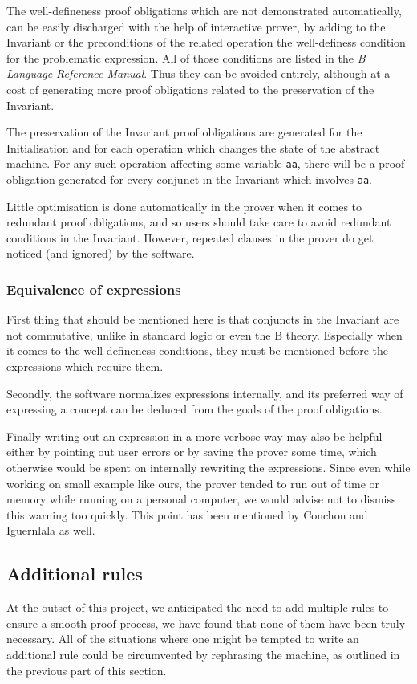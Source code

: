 \documentclass[12pt,journal,duplex]{IEEEtran}
\begin{document}
	The well-defineness proof obligations which are not demonstrated automatically, can be easily discharged with the help of interactive prover, by adding to the Invariant or the preconditions of the related operation the well-definess condition for the problematic expression. All of those conditions are listed in the \emph{B Language Reference Manual}. Thus they can be avoided entirely, although at a cost of generating more proof obligations related to the preservation of the Invariant.

	The preservation of the Invariant proof obligations are generated for the Initialisation and for each operation which changes the state of the abstract machine. For any such operation affecting some variable \texttt{aa}, there will be a proof obligation generated for every conjunct in the Invariant which involves \texttt{aa}.

	Little optimisation is done automatically in the prover when it comes to redundant proof obligations, and so users should take care to avoid redundant conditions in the Invariant. However, repeated clauses in the prover do get noticed (and ignored) by the software.

	\subsubsection{Equivalence of expressions}

	First thing that should be mentioned here is that conjuncts in the Invariant are not commutative, unlike in standard logic or even the B theory. Especially when it comes to the well-defineness conditions, they must be mentioned before the expressions which require them.

	Secondly, the software normalizes expressions internally, and its preferred way of expressing a concept can be deduced from the goals of the proof obligations.

	Finally writing out an expression in a more verbose way may also be helpful - either by pointing out user errors or by saving the prover some time, which otherwise would be spent on internally rewriting the expressions. Since even while working on small example like ours, the prover tended to run out of time or memory while running on a personal computer, we would advise not to dismiss this warning too quickly. This point has been mentioned by Conchon and Iguernlala as well\cite{San Juan metro}.

	\subsection{Additional rules}
	At the outset of this project, we anticipated the need to add multiple rules to ensure a smooth proof process, we have found that none of them have been truly necessary. All of the situations where one might be tempted to write an additional rule could be circumvented by rephrasing the machine, as outlined in the previous part of this section.
\end{document}
